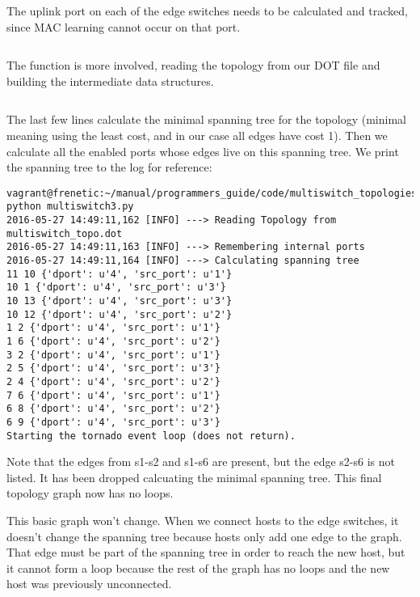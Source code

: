 \inputminted[firstline=29,lastline=33]{python}{code/multiswitch_topologies/network_information_base_from_file.py}

The uplink port on each of the edge switches needs to be calculated and tracked, since MAC learning cannot
occur on that port.

\inputminted[firstline=18,lastline=19]{python}{code/multiswitch_topologies/network_information_base_from_file.py}

The  function is more involved, reading the topology from our DOT file and building the 
intermediate data structures.

\inputminted[firstline=40,lastline=94]{python}{code/multiswitch_topologies/network_information_base_from_file.py}

The last few lines calculate the minimal spanning tree for the topology (minimal meaning using the least cost, and
in our case all edges have cost 1).  Then we calculate all the enabled ports whose edges live on this
spanning tree.  We print the spanning tree to the log for reference:

\begin{verbatim}
vagrant@frenetic:~/manual/programmers_guide/code/multiswitch_topologies$ python multiswitch3.py
2016-05-27 14:49:11,162 [INFO] ---> Reading Topology from multiswitch_topo.dot
2016-05-27 14:49:11,163 [INFO] ---> Remembering internal ports
2016-05-27 14:49:11,164 [INFO] ---> Calculating spanning tree
11 10 {'dport': u'4', 'src_port': u'1'}
10 1 {'dport': u'4', 'src_port': u'3'}
10 13 {'dport': u'4', 'src_port': u'3'}
10 12 {'dport': u'4', 'src_port': u'2'}
1 2 {'dport': u'4', 'src_port': u'1'}
1 6 {'dport': u'4', 'src_port': u'2'}
3 2 {'dport': u'4', 'src_port': u'1'}
2 5 {'dport': u'4', 'src_port': u'3'}
2 4 {'dport': u'4', 'src_port': u'2'}
7 6 {'dport': u'4', 'src_port': u'1'}
6 8 {'dport': u'4', 'src_port': u'2'}
6 9 {'dport': u'4', 'src_port': u'3'}
Starting the tornado event loop (does not return).
\end{verbatim}

Note that the edges from s1-s2 and s1-s6 are present, but the edge s2-s6 is not listed.  It has been 
dropped calcuating the minimal spanning tree.  This final topology graph now has no loops.

This basic graph won't change.  When we connect hosts to the edge switches, it doesn't change the 
spanning tree because hosts only add one edge to the graph.  That edge must be part of the spanning tree
in order to reach the new host, but it cannot form a loop because the rest of the graph has no loops
and the new host was previously unconnected.  

